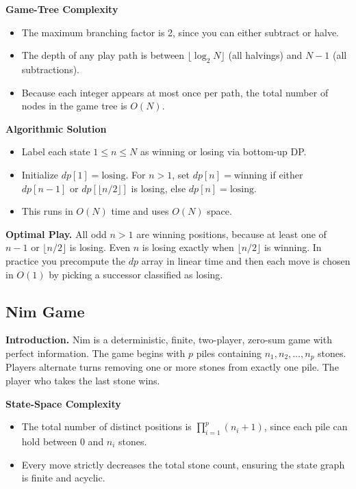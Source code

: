 \documentclass[12pt]{article}
\begin{document}
\noindent\textbf{Game-Tree Complexity}
\begin{itemize}
  \item The maximum branching factor is 2, since you can either subtract or halve.
  \item The depth of any play path is between $\lfloor\log_2 N\rfloor$ (all halvings) and $N-1$ (all subtractions).
  \item Because each integer appears at most once per path, the total number of nodes in the game tree is $O(N)$.
\end{itemize}

\noindent\textbf{Algorithmic Solution}
\begin{itemize}
  \item Label each state $1\le n\le N$ as winning or losing via bottom‑up DP.
  \item Initialize $dp[1]=\text{losing}$. For $n>1$, set $dp[n]=\text{winning}$ if either $dp[n-1]$ or $dp[\lfloor n/2\rfloor]$ is losing, else $dp[n]=\text{losing}$.
  \item This runs in $O(N)$ time and uses $O(N)$ space.
\end{itemize}

\noindent\textbf{Optimal Play.}  
All odd $n>1$ are winning positions, because at least one of $n-1$ or $\lfloor n/2\rfloor$ is losing. Even $n$ is losing exactly when $\lfloor n/2\rfloor$ is winning. In practice you precompute the $dp$ array in linear time and then each move is chosen in $O(1)$ by picking a successor classified as losing.

\subsection{Nim Game}

\textbf{Introduction.}  
Nim is a deterministic, finite, two-player, zero-sum game with perfect information. The game begins with $p$ piles containing $n_1,n_2,\dots,n_p$ stones. Players alternate turns removing one or more stones from exactly one pile. The player who takes the last stone wins.

\vspace{1em}

\noindent\textbf{State-Space Complexity}
\begin{itemize}
  \item The total number of distinct positions is $\prod_{i=1}^{p}(n_i+1)$, since each pile can hold between 0 and $n_i$ stones.
  \item Every move strictly decreases the total stone count, ensuring the state graph is finite and acyclic.
\end{itemize}
\end{document}
